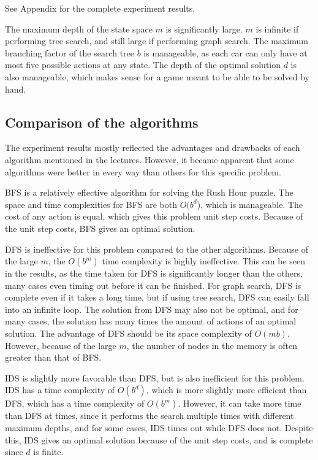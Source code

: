 \documentclass[12pt, a4paper]{article}
\begin{document}
See Appendix for the complete experiment results. 

The maximum depth of the state space $m$ is significantly large. $m$ is infinite if performing tree search, and still large if performing graph search. The maximum branching factor of the search tree $b$ is manageable, as each car can only have at most five possible actions at any state. The depth of the optimal solution $d$ is also manageable, which makes sense for a game meant to be able to be solved by hand.

\subsection{Comparison of the algorithms}

The experiment results mostly reflected the advantages and drawbacks of each algorithm mentioned in the lectures. However, it became apparent that some algorithms were better in every way than others for this specific problem.

BFS is a relatively effective algorithm for solving the Rush Hour puzzle. The space and time complexities for BFS are both $O(b^d$), which is manageable. The cost of any action is equal, which gives this problem unit step costs. Because of the unit step costs, BFS gives an optimal solution.

DFS is ineffective for this problem compared to the other algorithms. Because of the large $m$, the $O(b^m)$ time complexity is highly ineffective. This can be seen in the results, as the time taken for DFS is significantly longer than the others, many cases even timing out before it can be finished. For graph search, DFS is complete even if it takes a long time, but if using tree search, DFS can easily fall into an infinite loop. The solution from DFS may also not be optimal, and for many cases, the solution has many times the amount of actions of an optimal solution. The advantage of DFS should be its space complexity of $O(mb)$. However, because of the large $m$, the number of nodes in the memory is often greater than that of BFS.

IDS is slightly more favorable than DFS, but is also inefficient for this problem. IDS has a time complexity of $O(b^d)$, which is more slightly more efficient than DFS, which has a time complexity of $O(b^m)$. However, it can take more time than DFS at times, since it performs the search multiple times with different maximum depths, and for some cases, IDS times out while DFS does not. Despite this, IDS gives an optimal solution because of the unit step costs, and is complete since $d$ is finite.
\end{document}
